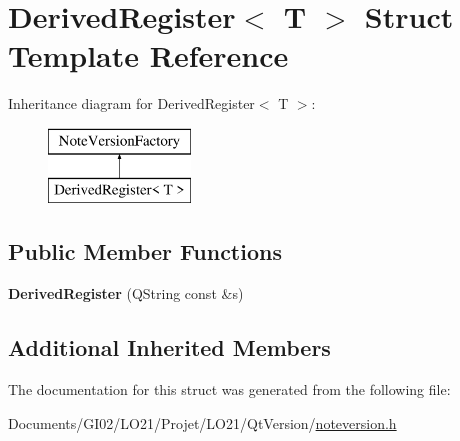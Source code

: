 \hypertarget{struct_derived_register}{}\section{Derived\+Register$<$ T $>$ Struct Template Reference}
\label{struct_derived_register}
Inheritance diagram for Derived\+Register$<$ T $>$\+:\begin{figure}[H]
\begin{center}
\leavevmode
\includegraphics[height=2.000000cm]{struct_derived_register}
\end{center}
\end{figure}
\subsection*{Public Member Functions}
\begin{DoxyCompactItemize}
\item 
\mbox{\label{struct_derived_register_af89892a9b8487f33b8824b662d2a6f4a}} 
{\bfseries Derived\+Register} (Q\+String const \&s)
\end{DoxyCompactItemize}
\subsection*{Additional Inherited Members}


The documentation for this struct was generated from the following file\+:\begin{DoxyCompactItemize}
\item 
Documents/\+G\+I02/\+L\+O21/\+Projet/\+L\+O21/\+Qt\+Version/\hyperlink{noteversion_8h}{noteversion.\+h}\end{DoxyCompactItemize}
